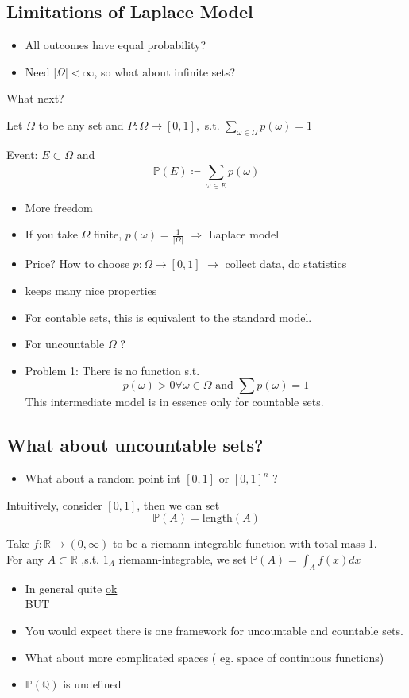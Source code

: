 \documentclass[../main.tex]{subfiles}
\begin{document}
\subsection*{Limitations of Laplace Model}
\begin{itemize}
\item All outcomes have equal probability?
\item Need $|\Omega|< \infty $, so what about infinite sets?
\end{itemize}
What next?
\begin{defn}
	Let $\Omega$ to be any set and $P:\Omega \to [ 0,1] , $ s.t. $\sum_{\omega\in \Omega} p( \omega)=1 $ 
\end{defn}
Event: $E \subset \Omega$ and
\[ 
	\mathbb{P}( E) \coloneqq \sum_{\omega\in E}^{ }p( \omega) 
\]
\begin{itemize}
\item More freedom
\item If you take $\Omega$ finite, $p( \omega) = \frac{1}{|\Omega|}$ $\Rightarrow$ Laplace model
\item Price? How to choose $p: \Omega \to [ 0,1] $ $\to$ collect data, do statistics
\item keeps many nice properties
\item For contable sets, this is equivalent to the standard model.
\item For uncountable $\Omega$ ?
\item Problem 1:
	There is no function s.t.
	\[ 
		p( \omega) >0 \forall \omega \in \Omega \text{ and } \sum p( \omega) =1
	\]
This intermediate model is in essence only for countable sets.	
\end{itemize}
\subsection*{What about uncountable sets?}
\begin{itemize}
\item What about a random point int $ [ 0,1] $ or $ [ 0,1] ^{n}$ ?
\end{itemize}
Intuitively, consider $[0,1]$, then we can set
\[ 
	\mathbb{P}( A) = \mathrm { length} ( A) 
\]
\begin{defn}
	Take $f: \mathbb{R}\to ( 0, \infty ) $ to be a riemann-integrable function with total mass 1.\\
	For any $A \subset \mathbb{R}$ ,s.t. $1_A$ riemann-integrable, we set $ \mathbb{P}( A) = \int_A f( x) dx$ 
\end{defn}
\begin{itemize}
	\item In general quite \underline{ok}\\
		BUT\\

	\item You would expect there is one framework for uncountable and countable sets.
	\item What about more complicated spaces ( eg. space of continuous functions) 
	\item $ \mathbb{P}( \mathbb{Q}) $ is undefined
\end{itemize}
\end{document}
